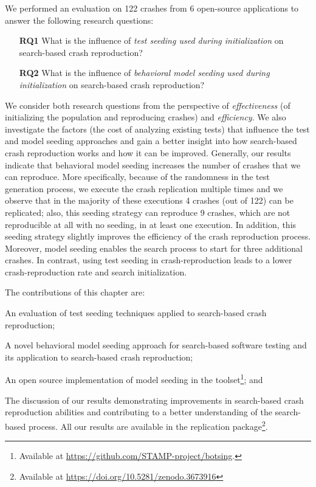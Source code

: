 We performed an evaluation on 122 crashes from 6 open-source applications to answer the following research questions: 
%
\begin{itemize}
\item[\textbf{RQ1}] What is the influence of \emph{test seeding used during initialization} on search-based crash reproduction?
\item[\textbf{RQ2}]  What is the influence of \emph{behavioral model seeding used during initialization}  on search-based crash reproduction?
\end{itemize}
%
We consider both research questions from the perspective of \emph{effectiveness} (of initializing the population and reproducing crashes) and \emph{efficiency}. We also investigate the factors (\eg the cost of analyzing existing tests) that influence the test and model seeding approaches and gain a better insight into how search-based crash reproduction works and how it can be improved.
Generally, our results indicate that behavioral model seeding increases the number of crashes that we can reproduce. 
More specifically, because of the randomness in the test generation process, we execute the crash replication multiple times and we observe that in the majority of these executions 4 crashes (out of 122) can be replicated; also, this seeding strategy can reproduce 9 crashes, which are not reproducible at all with no seeding, in at least one execution. In addition, this seeding strategy slightly improves the efficiency of the crash reproduction process. Moreover, model seeding enables the search process to start for three additional crashes. In contrast, using test seeding in crash-reproduction leads to a lower crash-reproduction rate and search initialization.

The contributions of this chapter are:
\begin{compactenum}
    \item An evaluation of test seeding techniques applied to search-based crash reproduction;
    \item A novel behavioral model seeding approach for search-based software testing and its application to search-based crash reproduction;
    \item An open source implementation of model seeding in the \botsing toolset\footnote{Available at \url{https://github.com/STAMP-project/botsing}.}; and
    \item The discussion of our results demonstrating improvements in search-based crash reproduction abilities and contributing to a better understanding of the search-based process. All our results are available in the replication package\footnote{Available at \url{https://doi.org/10.5281/zenodo.3673916}}.
\end{compactenum}

